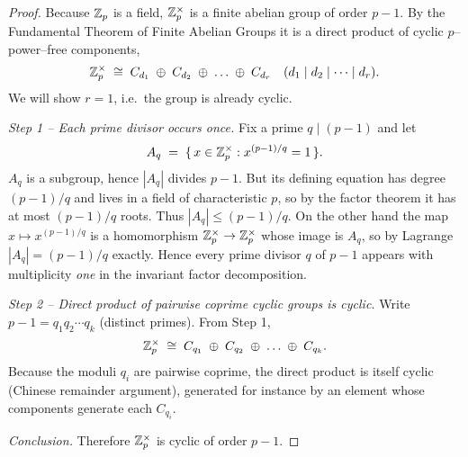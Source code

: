 \documentclass[12pt]{article}
\theoremstyle{definition} %
\theoremstyle{plain} %
\begin{document}
  \begin{proof}
  Because $\Bbb Z_{p}$ is a field, $\Bbb Z_{p}^{\times}$ is a finite
  abelian group of order $p-1$.
  By the Fundamental Theorem of Finite Abelian Groups it is a direct
  product of cyclic $p$–power–free components,
  \[
        \Bbb Z_{p}^{\times}\;\cong\;
        C_{d_{1}}\;\oplus\;C_{d_{2}}\;\oplus\;\dots\;\oplus\;C_{d_{r}}
        \quad(d_{1}\mid d_{2}\mid\cdots\mid d_{r}).
  \]
  We will show $r=1$, i.e.\ the group is already cyclic.
  
  \medskip
  \textit{Step 1 – Each prime divisor occurs once.}
  Fix a prime $q\mid(p-1)$ and let
  \[
         A_q \;=\; \{\,x\in\Bbb Z_{p}^{\times} : x^{(p-1)/q}=1\,\}.
  \]
  $A_q$ is a subgroup, hence $|A_q|$ divides $p-1$.
  But its defining equation has degree $(p-1)/q$ and lives in a field of
  characteristic $p$, so by the factor theorem it has at most
  $(p-1)/q$ roots.  Thus $|A_q|\le(p-1)/q$.
  On the other hand the map $x\mapsto x^{(p-1)/q}$ is a homomorphism
  $\Bbb Z_{p}^{\times}\to\Bbb Z_{p}^{\times}$ whose image is $A_q$, so by
  Lagrange $|A_q|=(p-1)/q$ exactly.  Hence every prime divisor $q$ of
  $p-1$ appears with multiplicity \emph{one} in the invariant factor
  decomposition.
  
  \smallskip
  \textit{Step 2 – Direct product of pairwise coprime cyclic groups is cyclic.}
  Write $p-1=q_{1}q_{2}\cdots q_{k}$ (distinct primes).
  From Step 1,
  \[
       \Bbb Z_{p}^{\times}\;\cong\;
       C_{q_{1}}\;\oplus\;C_{q_{2}}\;\oplus\;\dots\;\oplus\;C_{q_{k}}.
  \]
  Because the moduli $q_{i}$ are pairwise coprime, the direct product is
  itself cyclic (Chinese remainder argument), generated for instance by an
  element whose components generate each $C_{q_{i}}$.
  
  \smallskip
  \textit{Conclusion.}
  Therefore $\Bbb Z_{p}^{\times}$ is cyclic of order $p-1$.
  \end{proof}
\end{document}
